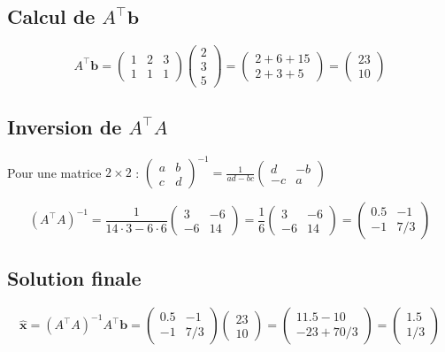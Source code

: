 \documentclass[12pt,a4paper]{article}
\newcommand{\T}{^\top}
\begin{document}
\subsection{Calcul de $A\T \mathbf{b}$}

\[
A\T \mathbf{b} = \begin{pmatrix} 1 & 2 & 3 \\ 1 & 1 & 1 \end{pmatrix}
\begin{pmatrix} 2 \\ 3 \\ 5 \end{pmatrix}
= \begin{pmatrix} 2+6+15 \\ 2+3+5 \end{pmatrix}
= \begin{pmatrix} 23 \\ 10 \end{pmatrix}
\]

\subsection{Inversion de $A\T A$}

Pour une matrice $2 \times 2$ : $\begin{pmatrix} a & b \\ c & d \end{pmatrix}^{-1} = \frac{1}{ad-bc} \begin{pmatrix} d & -b \\ -c & a \end{pmatrix}$

\[
(A\T A)^{-1} = \frac{1}{14 \cdot 3 - 6 \cdot 6} \begin{pmatrix} 3 & -6 \\ -6 & 14 \end{pmatrix}
= \frac{1}{6} \begin{pmatrix} 3 & -6 \\ -6 & 14 \end{pmatrix}
= \begin{pmatrix} 0.5 & -1 \\ -1 & 7/3 \end{pmatrix}
\]

\subsection{Solution finale}

\[
\hat{\mathbf{x}} = (A\T A)^{-1} A\T \mathbf{b}
= \begin{pmatrix} 0.5 & -1 \\ -1 & 7/3 \end{pmatrix}
\begin{pmatrix} 23 \\ 10 \end{pmatrix}
= \begin{pmatrix} 11.5 - 10 \\ -23 + 70/3 \end{pmatrix}
= \begin{pmatrix} 1.5 \\ 1/3 \end{pmatrix}
\]
\end{document}
